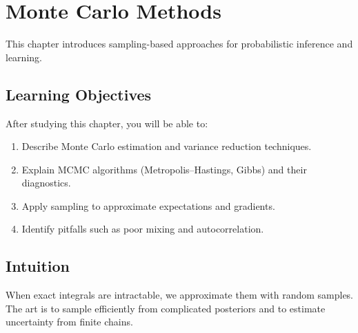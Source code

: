 
\chapter{Monte Carlo Methods}
\label{chap:monte-carlo}

This chapter introduces sampling-based approaches for probabilistic inference and learning.


\section*{Learning Objectives}

After studying this chapter, you will be able to:

\begin{enumerate}
    \item Describe Monte Carlo estimation and variance reduction techniques.
    \item Explain MCMC algorithms (Metropolis–Hastings, Gibbs) and their diagnostics.
    \item Apply sampling to approximate expectations and gradients.
    \item Identify pitfalls such as poor mixing and autocorrelation.
\end{enumerate}



\section*{Intuition}

When exact integrals are intractable, we approximate them with random samples. The art is to sample efficiently from complicated posteriors and to estimate uncertainty from finite chains.











